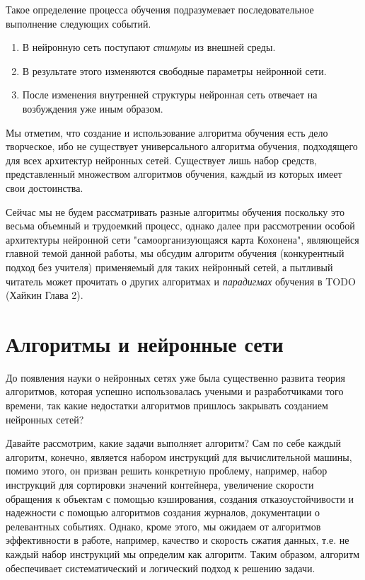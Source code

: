 \documentclass[a4paper,12pt]{report}
\begin{document}
Такое определение процесса обучения подразумевает последовательное
выполнение следующих событий.
\begin{enumerate}
    \item В нейронную сеть поступают \textit{стимулы} из внешней
        среды.
    \item В результате этого изменяются свободные параметры нейронной
        сети.
    \item После изменения внутренней структуры нейронная сеть отвечает
        на возбуждения уже иным образом.
\end{enumerate}

Мы отметим, что создание и использование алгоритма обучения есть дело
творческое, ибо не существует универсального алгоритма обучения,
подходящего для всех архитектур нейронных сетей. Существует лишь набор
средств, представленный множеством алгоритмов обучения, каждый из
которых имеет свои достоинства.

Сейчас мы не будем рассматривать разные алгоритмы обучения поскольку
это весьма объемный и трудоемкий процесс, однако далее при
рассмотрении особой архитектуры нейронной сети "самоорганизующаяся
карта Кохонена", являющейся главной темой данной работы, мы обсудим
алгоритм обучения (конкурентный подход без учителя) применяемый для
таких нейронный сетей, а пытливый читатель может прочитать о других
алгоритмах и \textit{парадигмах}
обучения в TODO (Хайкин Глава 2).

\section{Алгоритмы и нейронные сети}
До появления науки о нейронных сетях уже была существенно развита
теория алгоритмов, которая успешно использовалась учеными и
разработчиками того времени, так какие недостатки алгоритмов пришлось
закрывать созданием нейронных сетей?

Давайте рассмотрим, какие задачи выполняет алгоритм? Сам по себе
каждый алгоритм, конечно, является набором инструкций для
вычислительной машины, помимо этого, он призван решить конкретную
проблему, например, набор инструкций для сортировки значений
контейнера, увеличение скорости обращения к объектам с помощью
кэширования, создания отказоустойчивости и надежности с помощью
алгоритмов создания журналов, документации о релевантных событиях.
Однако, кроме этого, мы ожидаем от алгоритмов эффективности в работе,
например, качество и скорость сжатия данных, т.е. не каждый набор
инструкций мы определим как алгоритм. Таким образом, алгоритм
обеспечивает систематический и логический подход к решению задачи.
\end{document}
